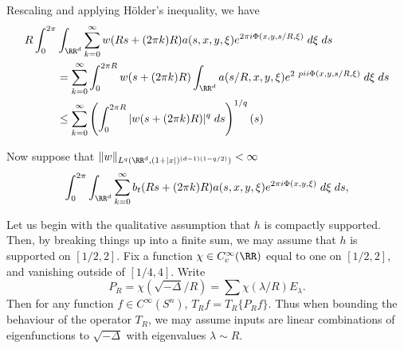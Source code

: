 Rescaling and applying H\"{o}lder's inequality, we have
%
\begin{align*}
    R \int_0^{2\pi} & \int_{\RR^d} \sum_{k = 0}^\infty w(R s + (2 \pi k) R) a(s,x,y,\xi) e^{2 \pi i \Phi(x,y,s/R,\xi)}\; d\xi\; ds\\
    &= \sum_{k = 0}^\infty \int_0^{2 \pi R} w(s + (2 \pi k) R) \int_{\RR^d} a(s/R,x,y,\xi) e^{2\ pi i \Phi(x,y,s/R,\xi)}\; d\xi\; ds\\
    &\leq \sum_{k = 0}^\infty \left( \int_0^{2\pi R} |w(s + (2 \pi k) R)|^q\; ds \right)^{1/q} \left( s \right)
\end{align*}


Now suppose that $\| w \|_{L^q(\RR^d, (1 + |x|)^{(d-1)(1 - q/2)})} < \infty$
%
\[ \int_0^{2\pi} \int_{\RR^d} \sum_{k = 0}^\infty b_t(R s + (2 \pi k) R) a(s,x,y,\xi) e^{2 \pi i \Phi(x,y,\xi)}\; d\xi\; ds, \]

Let us begin with the qualitative assumption that $h$ is compactly supported. Then, by breaking things up into a finite sum, we may assume that $h$ is supported on $[1/2,2]$. Fix a function $\chi \in C_c^\infty(\RR)$ equal to one on $[1/2,2]$, and vanishing outside of $[1/4,4]$. Write
%
\[ P_R = \chi \left( \sqrt{-\Delta} / R \right) = \sum \chi(\lambda / R) E_\lambda. \]
%
Then for any function $f \in C^\infty(S^n)$, $T_R f = T_R \{ P_R f \}$. Thus when bounding the behaviour of the operator $T_R$, we may assume inputs are linear combinations of eigenfunctions to $\sqrt{-\Delta}$ with eigenvalues $\lambda \sim R$.






